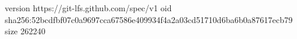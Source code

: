 version https://git-lfs.github.com/spec/v1
oid sha256:52bcdfbf07c0a9697cca67586e409934f4a2a03cd51710d6ba6b0a87617ecb79
size 262240
